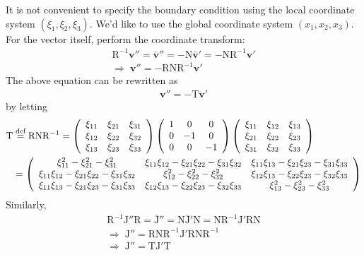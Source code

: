 \documentclass[a4paper,12pt,dvips]{article}
\newcommand*\defeq{\buildrel{\text{def}}\over{=}}
\begin{document}
It is not convenient to specify the boundary condition using the local
coordinate system $(\xi_1, \xi_2, \xi_3)$.  We'd like to use the global
coordinate system $(x_1, x_2, x_3)$.  For the vector itself, perform the
coordinate transform:
\begin{gather*}
  \mathrm{R}^{-1}\mathbf{v}''
  = \bar{\mathbf{v}}''
  = -\mathrm{N}\bar{\mathbf{v}}'
  = -\mathrm{N}\mathrm{R}^{-1}\mathbf{v}'
  \\
  \Rightarrow \;
  \mathbf{v}'' = -\mathrm{RNR^{-1}}\mathbf{v}'
\end{gather*}
The above equation can be rewritten as
\begin{align*}
  \mathbf{v}'' = -\mathrm{T}\mathbf{v}'
\end{align*}
by letting
\begin{align*}
  \mathrm{T}
 &\defeq \mathrm{RNR^{-1}}
  = \left(\begin{array}{ccc}
    \xi_{11} & \xi_{21} & \xi_{31} \\
    \xi_{12} & \xi_{22} & \xi_{32} \\
    \xi_{13} & \xi_{23} & \xi_{33}
  \end{array}\right)
  \left(\begin{array}{ccc}
    1 & 0 & 0 \\
    0 & -1 & 0 \\
    0 & 0 & -1
  \end{array}\right)
  \left(\begin{array}{ccc}
    \xi_{11} & \xi_{12} & \xi_{13} \\
    \xi_{21} & \xi_{22} & \xi_{23} \\
    \xi_{31} & \xi_{32} & \xi_{33}
  \end{array}\right)
  \\
 &= \left(\begin{array}{ccc}
    \xi_{11}^2       - \xi_{21}^2       - \xi_{31}^2       &
    \xi_{11}\xi_{12} - \xi_{21}\xi_{22} - \xi_{31}\xi_{32} &
    \xi_{11}\xi_{13} - \xi_{21}\xi_{23} - \xi_{31}\xi_{33} \\
    \xi_{11}\xi_{12} - \xi_{21}\xi_{22} - \xi_{31}\xi_{32} &
    \xi_{12}^2       - \xi_{22}^2       - \xi_{32}^2       &
    \xi_{12}\xi_{13} - \xi_{22}\xi_{23} - \xi_{32}\xi_{33} \\
    \xi_{11}\xi_{13} - \xi_{21}\xi_{23} - \xi_{31}\xi_{33} &
    \xi_{12}\xi_{13} - \xi_{22}\xi_{23} - \xi_{32}\xi_{33} &
    \xi_{13}^2       - \xi_{23}^2       - \xi_{33}^2
  \end{array}\right)
\end{align*}
Similarly,
\begin{gather*}
  \mathrm{R^{-1}J''R} = \bar{\mathrm{J}}'' = \mathrm{N\bar{J}'N}
  = \mathrm{NR^{-1}J'RN}
  \\
  \Rightarrow \;
  \mathrm{J}'' = \mathrm{RNR^{-1}J'RNR^{-1}}
  \\
  \Rightarrow \;
  \mathrm{J}'' = \mathrm{TJ'T}
\end{gather*}
\end{document}
